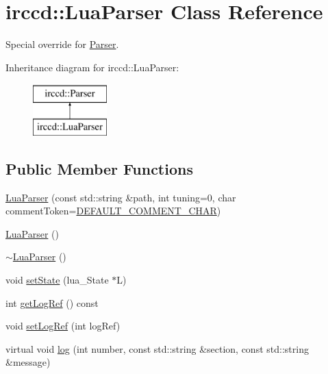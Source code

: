 \hypertarget{a00046}{\section{irccd\-:\-:Lua\-Parser Class Reference}
\label{a00046}
}


Special override for \hyperlink{a00048}{Parser}.  


Inheritance diagram for irccd\-:\-:Lua\-Parser\-:\begin{figure}[H]
\begin{center}
\leavevmode
\includegraphics[height=2.000000cm]{a00046}
\end{center}
\end{figure}
\subsection*{Public Member Functions}
\begin{DoxyCompactItemize}
\item 
\hyperlink{a00046_ae5b2e85e0327d6c88b600bc765481899}{Lua\-Parser} (const std\-::string \&path, int tuning=0, char comment\-Token=\hyperlink{a00048_a320f7053edb7ee8cf43ca21e5c734c3d}{D\-E\-F\-A\-U\-L\-T\-\_\-\-C\-O\-M\-M\-E\-N\-T\-\_\-\-C\-H\-A\-R})
\item 
\hyperlink{a00046_ad46079f5763eb3e1600dc26d953932bc}{Lua\-Parser} ()
\item 
\hyperlink{a00046_a8309a218659b876cf28809dee06f2591}{$\sim$\-Lua\-Parser} ()
\item 
void \hyperlink{a00046_aac6dd095679b81cb7939084f0c926b22}{set\-State} (lua\-\_\-\-State $\ast$L)
\item 
int \hyperlink{a00046_a5f7335cba11f1a3eeeb9cf719ac2995a}{get\-Log\-Ref} () const 
\item 
void \hyperlink{a00046_aed2084e2257de010d89c9e97cd3c37d5}{set\-Log\-Ref} (int log\-Ref)
\item 
virtual void \hyperlink{a00046_ae06d96a7d2dab3d014904596220ce8e4}{log} (int number, const std\-::string \&section, const std\-::string \&message)
\begin{DoxyCompactList}\small\item\em \end{DoxyCompactList}\end{DoxyCompactItemize}

